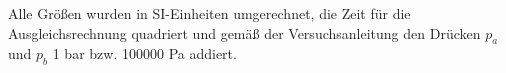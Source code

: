
Alle Größen wurden in SI-Einheiten umgerechnet, die Zeit für die Ausgleichsrechnung quadriert und gemäß
der Versuchsanleitung \cite{v206} den Drücken $\textit{p}_\textit{a}$ und $\textit{p}_\textit{b}$ 1 bar bzw. 100000 Pa addiert.

